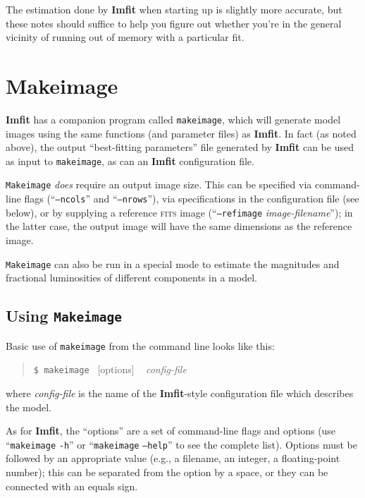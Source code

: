 \documentclass[10pt,a4paper,article]{memoir}
\newcommand{\imfit}{\textbf{Imfit}}
\newcommand{\Imfit}{\textbf{Imfit}}
\newcommand{\makeimage}{\texttt{makeimage}}
\newcommand{\Makeimage}{\texttt{Makeimage}}
\begin{document}
The estimation done by \imfit{} when starting up is slightly more accurate, but these
notes should suffice to help you figure out whether you're in the general vicinity of running out
of memory with a particular fit.




\chapter{Makeimage}

\Imfit{} has a companion program called \makeimage, which will generate model
images using the same functions (and parameter files) as \imfit. In fact (as
noted above), the output ``best-fitting parameters'' file generated by \imfit{}
can be used as input to \makeimage, as can an \imfit{} configuration file.

\Makeimage{} \textit{does} require an output image size.  This can be specified
via command-line flags (``\texttt{--ncols}'' and ``\texttt{--nrows}''), via
specifications in the configuration file (see below), or by supplying a
reference \textsc{fits} image (``\texttt{--refimage} \textit{image-filename}''); in the
latter case, the output image will have the same dimensions as the reference
image.

\Makeimage{} can also be run in a special mode to estimate the
magnitudes and fractional luminosities of different components in a
model.


\section{Using \Makeimage{}}

Basic use of \makeimage{} from the command line looks like this:
\begin{quote}
  \texttt{\$ \makeimage{} }  [options] ~ \textit{config-file}
\end{quote}
where \textit{config-file} is the name of the \imfit{}-style configuration file
which describes the model.

As for \imfit, the ``options'' are a set of command-line flags and
options (use ``\makeimage{} \texttt{-h}'' or ``\makeimage{} \texttt{--help}'' to
see the complete list). Options must be followed by an appropriate value
(e.g., a filename, an integer, a floating-point number); this can be
separated from the option by a space, or they can be connected with an
equals sign.

\bigskip
\end{document}

